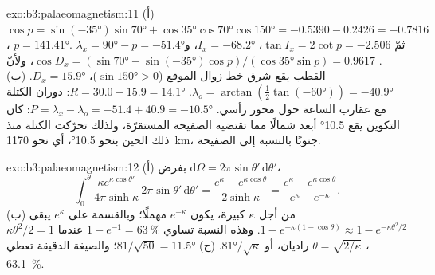 \begin{solution}{exo:b3:palaeomagnetism:11}
(أ) $\cos p = \sin(\ang{-35})\sin\ang{70} + \cos\ang{35}\cos\ang{70}\cos\ang{150}
= -0.5390 - 0.2426 = -0.7816$، $p = \ang{141.41}$. ثمّ $\tan I_x = 2\cot p =
-2.506$، $I_x = \ang{-68.2}$، و$\lambda_x = \ang{90} - p = \ang{-51.4}$.
$\cos D_x = (\sin\ang{70} - \sin(\ang{-35})\cos p)/(\cos\ang{35}\sin p) =
0.9617$، ولأنّ القطب يقع شرق خط زوال الموقع ($\sin\ang{150} >
0$)، $D_x = \ang{15.9}$. (ب) $\lambda_o = \arctan(\tfrac12\tan(\ang{-60})) =
\ang{-40.9}$. $R = 30.0 - 15.9 = \ang{14.1}$: دوران الكتلة مع عقارب الساعة
حول محور رأسي. $P = \lambda_x - \lambda_o = -51.4 + 40.9 =
\ang{-10.5}$: كان التكوين يقع \ang{10.5} أبعد شمالًا مما تقتضيه الصفيحة المستقرّة،
ولذلك تحرّكت الكتلة منذ ذلك الحين بنحو \ang{10.5}،
أي نحو \qty{1170}{km}، جنوبًا بالنسبة إلى الصفيحة.
\end{solution}

\begin{solution}{exo:b3:palaeomagnetism:12}
(أ) بفرض $\mathrm d\Omega = 2\pi\sin\theta'\,\mathrm d\theta'$،
\[
  \int_0^\theta\frac{\kappa e^{\kappa\cos\theta'}}{4\pi\sinh\kappa}\,2\pi\sin\theta'\,
  \mathrm d\theta' = \frac{e^\kappa - e^{\kappa\cos\theta}}{2\sinh\kappa}
  = \frac{e^\kappa - e^{\kappa\cos\theta}}{e^\kappa - e^{-\kappa}} .
\]
(ب) من أجل $\kappa$ كبيرة، يكون $e^{-\kappa}$ مهملًا؛ وبالقسمة على $e^\kappa$
يبقى $1 - e^{-\kappa(1 - \cos\theta)} \approx 1 - e^{-\kappa\theta^2/2}$. وهذه النسبة
تساوي $1 - e^{-1} = \qty{63}{\percent}$ عندما $\kappa\theta^2/2 = 1$، $\theta =
\sqrt{2/\kappa}$ راديان، أو $\ang{81}/\sqrt\kappa$. (ج) $81/\sqrt{50} =
\ang{11.5}$؛ والصيغة الدقيقة تعطي \qty{63.1}{\percent}.
\end{solution}

